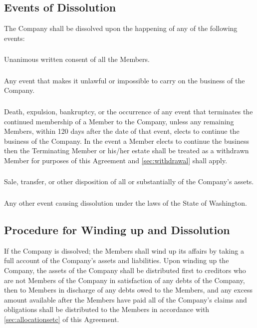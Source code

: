 \documentclass[11pt,onecolumn]{article}
\begin{document}
\subsection{Events of Dissolution}

The Company shall be dissolved upon the happening of any of the following events:
\subsubsection{} Unanimous written consent of all the Members.
\subsubsection{} Any event that makes it unlawful or impossible to carry on the business of the Company.
\subsubsection{} Death, expulsion, bankruptcy, or the occurrence of any event that terminates the continued membership of a Member to the Company, unless any remaining Members, within 120 days after the date of that event, elects to continue the business of the Company. In the event a Member elects to continue the business then the Terminating Member or his/her estate shall be treated as a withdrawn Member for purposes of this Agreement and \autoref{sec:withdrawal} shall apply.
\subsubsection{} Sale, transfer, or other disposition of all or substantially of the Company's assets.
\subsubsection{} Any other event causing dissolution under the laws of the State of Washington.

\subsection{Procedure for Winding up and Dissolution}

If the Company is dissolved; the Members shall wind up its affairs by taking a full account of the Company's assets and liabilities. Upon winding up the Company, the assets of the Company shall be distributed first to creditors who are not Members of the Company in satisfaction of any debts of the Company, then to Members in discharge of any debts owed to the Members, and any excess amount available after the Members have paid all of the Company's claims and obligations shall be distributed to the Members in accordance with \autoref{sec:allocationsetc} of this Agreement.
\end{document}
